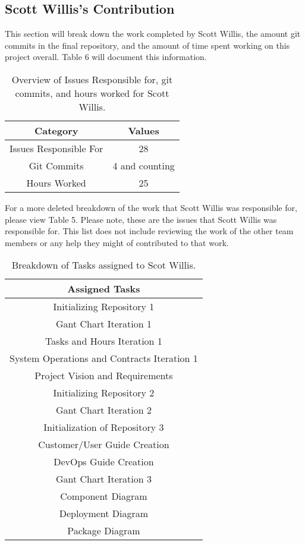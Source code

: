 \documentclass{article}
\begin{document}
	\subsection{Scott Willis's Contribution}
	
	This section will break down the work completed by Scott Willis, the amount git commits in the final repository, and the amount of time spent working on this project overall. Table 6 will document this information. 
	
	\begin{table}[htbp!]
		\centering
		\begin{tabular}{||c c ||} 
			\hline
			Category & Values \\ [0.5ex] 
			\hline\hline
			Issues Responsible For & 28  \\ 
			Git Commits & 4 and counting \\
			Hours Worked & 25 \\
			\hline
		\end{tabular}
		\caption{Overview of Issues Responsible for, git commits, and hours worked for Scott Willis.}
		\label{table:6}
	\end{table}
	
	For a more deleted breakdown of the work that Scott Willis was responsible for, please view Table 5. Please note, these are the issues that Scott Willis was responsible for. This list does not include reviewing the work of the other team members or any help they might of contributed to that work.
	
	\begin{table}[htbp!]
		\centering
		\begin{tabular}{||c ||} 
			\hline
			Assigned Tasks \\ [0.5ex] 
			\hline\hline
			Initializing Repository 1 \\
			Gant Chart Iteration 1 \\
			Tasks and Hours Iteration 1 \\
			System Operations and Contracts Iteration 1 \\
			Project Vision and Requirements \\
			Initializing Repository 2 \\
			Gant Chart Iteration 2 \\
			Initialization of Repository 3 \\
			Customer/User Guide Creation \\
			DevOps Guide Creation \\ 
			Gant Chart Iteration 3 \\
			Component Diagram \\
			Deployment Diagram \\
			Package Diagram \\   
			\hline
		\end{tabular}
		\caption{Breakdown of Tasks assigned to Scot Willis.}
		\label{table:7}
	\end{table}
	\vspace{2cm} 
\end{document}
